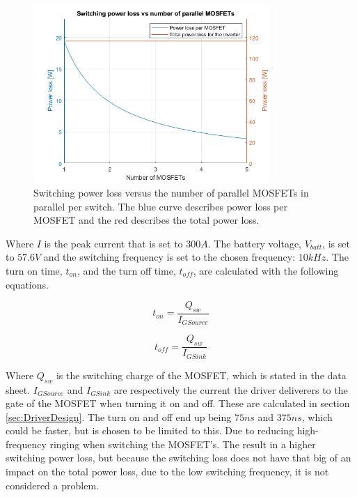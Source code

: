     \begin{figure}[H]
		\centering
		\includegraphics[width=0.8\textwidth]{pictures/hardware/Power_Board/Switch_loss.png}
		\caption{Switching power loss versus the number of parallel MOSFETs in parallel per switch. The blue curve describes power loss per MOSFET and the red describes the total power loss.}
		\label{fig:sw_loss}
	\end{figure}
	
Where $I$ is the peak current that is set to $300 A$. The battery voltage, $V_{batt}$, is set to $57.6 V$ and the switching frequency is set to the chosen frequency: $10 kHz$. The turn on time, $t_{on}$, and the turn off time, $t_{off}$, are calculated with the following equations.

    \begin{equation}
        t_{on} = \frac{Q_{sw}}{I_{GSource}}
    \end{equation}
    
    \begin{equation}
        t_{off} = \frac{Q_{sw}}{I_{GSink}}
    \end{equation}
    
Where $Q_{sw}$ is the switching charge of the MOSFET, which is stated in the data sheet.\cite{mosfet}
$I_{GSource}$ and $I_{GSink}$ are respectively the current the driver deliverers to the gate of the MOSFET when turning it on and off. These are calculated in section \ref{sec:DriverDesign}. The turn on and off end up being $75 ns$ and $375 ns$, which could be faster, but is chosen to be limited to this. Due to reducing high-frequency ringing when switching the MOSFET's. The result in a higher switching power loss, but because the switching loss does not have that big of an impact on the total power loss, due to the low switching frequency, it is not considered a problem.

